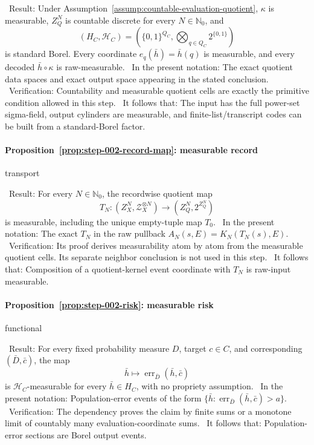 \noindent\textbullet\ Result: Under
  Assumption~\ref{assump:countable-evaluation-quotient}, \(\kappa\) is
  measurable, \(Z_Q^N\) is countable discrete for every
  \(N\in\mathbb N_0\), and
  \[
  (H_C,\mathcal H_C)
  =\left(\{0,1\}^{Q_C},
  \bigotimes_{q\in Q_C}2^{\{0,1\}}\right)
  \]
  is standard Borel. Every coordinate
  \(e_q(\bar h)=\bar h(q)\) is measurable, and every decoded
  \(\bar h\circ\kappa\) is raw-measurable.
\noindent\textbullet\ In the present notation: The exact quotient data spaces and exact output
  space appearing in the stated conclusion.
\noindent\textbullet\ Verification: Countability and measurable quotient cells are
  exactly the primitive condition allowed in this step.
\noindent\textbullet\ It follows that: The input has the full power-set sigma-field, output
  cylinders are measurable, and finite-list/transcript codes can be built
  from a standard-Borel factor.

\paragraph{Proposition~\ref{prop:step-002-record-map}: measurable record}
transport

\noindent\textbullet\ Result: For every \(N\in\mathbb N_0\), the recordwise quotient
  map
  \[
  T_N: (Z_X^N,\mathcal Z_X^{\otimes N})
  \longrightarrow (Z_Q^N,2^{Z_Q^N})
  \]
  is measurable, including the unique empty-tuple map \(T_0\).
\noindent\textbullet\ In the present notation: The exact \(T_N\) in the raw pullback
  \(A_N(s,E)=K_N(T_N(s),E)\).
\noindent\textbullet\ Verification: Its  proof derives measurability atom by
  atom from the measurable quotient cells. Its separate neighbor conclusion
  is not used in this step.
\noindent\textbullet\ It follows that: Composition of a quotient-kernel event coordinate with
  \(T_N\) is raw-input measurable.

\paragraph{Proposition~\ref{prop:step-002-risk}: measurable risk}
functional

\noindent\textbullet\ Result: For every fixed probability measure \(D\), target
  \(c\in C\), and corresponding \((\bar D,\bar c)\), the map
  \[
  \bar h\longmapsto
  \operatorname{err}_{\bar D}(\bar h,\bar c)
  \]
  is \(\mathcal H_C\)-measurable for every \(\bar h\in H_C\), with no
  propriety assumption.
\noindent\textbullet\ In the present notation: Population-error events of the form
  \(\{\bar h:\operatorname{err}_{\bar D}(\bar h,\bar c)>a\}\).
\noindent\textbullet\ Verification: The dependency proves the claim by finite sums or a
  monotone limit of countably many evaluation-coordinate sums.
\noindent\textbullet\ It follows that: Population-error sections are Borel output events.

